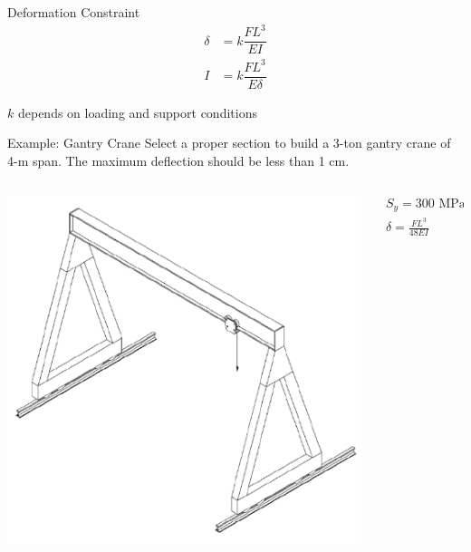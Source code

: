 \documentclass[10pt, svgnames]{beamer}
\begin{document}
\begin{frame}[label={sec:org5944563}]{Deformation Constraint}
\begin{align*}
  \delta &= k \dfrac{FL^3}{EI} \\
  I &= k \dfrac{FL^3}{E \delta}
\end{align*}

\(k\) depends on loading and support conditions
\end{frame}

\begin{frame}[label={sec:org0d4b1dc}]{Example: Gantry Crane}
Select a proper section to build a 3-ton gantry crane of 4-m span. The maximum deflection should be less than 1 cm.

\begin{columns}
\begin{column}{0.6\columnwidth}
\begin{center}
\includegraphics[width=.9\linewidth]{./pictures/gantry-crane.png}
\end{center}
\end{column}
\begin{column}{0.4\columnwidth}
\begin{gather*}
  S_y = 300 \text{ MPa} \\
  \delta = \frac{FL^3}{48EI}
\end{gather*}
\end{column}
\end{columns}
\end{frame}
\end{document}

